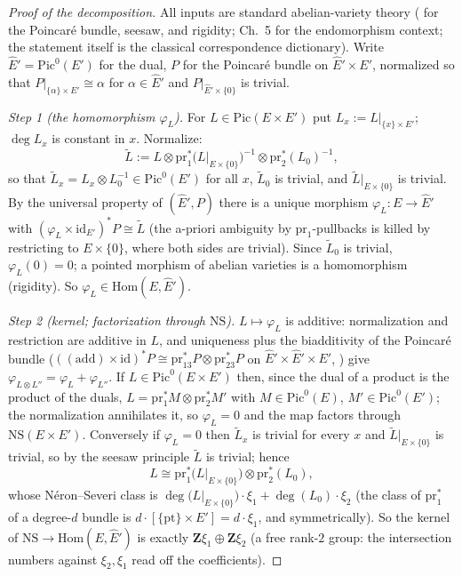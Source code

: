 \documentclass[11pt]{article}
\theoremstyle{definition}
\theoremstyle{remark}
\newcommand{\Z}{\mathbf{Z}}
\newcommand{\NS}{\mathrm{NS}}
\newcommand{\Hom}{\mathrm{Hom}}
\newcommand{\Pic}{\mathrm{Pic}}
\newcommand{\pr}{\mathrm{pr}}
\begin{document}
\begin{proof}[Proof of the decomposition]
All inputs are standard abelian-variety theory (\cite[Ch.~2]{BL} for the
Poincar\'e bundle, seesaw, and rigidity; Ch.~5 for the endomorphism context;
the statement itself is the classical correspondence dictionary). Write
$\hat{E}' = \Pic^0(E')$ for the dual, $P$ for the Poincar\'e bundle on
$\hat{E}' \times E'$, normalized so that
$P|_{\{\alpha\}\times E'} \cong \alpha$ for $\alpha \in \hat{E}'$ and
$P|_{\hat{E}'\times\{0\}}$ is trivial.

\emph{Step 1 (the homomorphism $\varphi_L$).} For $L \in \Pic(E\times E')$
put $L_x := L|_{\{x\}\times E'}$; $\deg L_x$ is constant in $x$. Normalize:
\[
\widetilde{L} := L \otimes \pr_1^*\bigl(L|_{E\times\{0\}}\bigr)^{-1}
 \otimes \pr_2^*(L_0)^{-1} ,
\]
so that $\widetilde{L}_x = L_x \otimes L_0^{-1} \in \Pic^0(E')$ for all $x$,
$\widetilde{L}_0$ is trivial, and $\widetilde{L}|_{E\times\{0\}}$ is
trivial. By the universal property of $(\hat{E}', P)$ there is a unique
morphism $\varphi_L\colon E \to \hat{E}'$ with
$(\varphi_L \times \mathrm{id}_{E'})^* P \cong \widetilde{L}$ (the a-priori
ambiguity by $\pr_1$-pullbacks is killed by restricting to $E\times\{0\}$,
where both sides are trivial). Since $\widetilde{L}_0$ is trivial,
$\varphi_L(0) = 0$; a pointed morphism of abelian varieties is a
homomorphism (rigidity). So $\varphi_L \in \Hom(E, \hat{E}')$.

\emph{Step 2 (kernel; factorization through $\NS$).} $L \mapsto \varphi_L$
is additive: normalization and restriction are additive in $L$, and
uniqueness plus the biadditivity of the Poincar\'e bundle
($((\mathrm{add})\times\mathrm{id})^* P \cong \pr_{13}^* P \otimes
\pr_{23}^* P$ on $\hat{E}'\times\hat{E}'\times E'$, \cite[Ch.~2]{BL}) give
$\varphi_{L\otimes L''} = \varphi_L + \varphi_{L''}$. If
$L \in \Pic^0(E\times E')$ then, since the dual of a product is the product
of the duals, $L = \pr_1^* M \otimes \pr_2^* M'$ with $M \in \Pic^0(E)$,
$M' \in \Pic^0(E')$; the normalization annihilates it, so $\varphi_L = 0$
and the map factors through $\NS(E\times E')$. Conversely if
$\varphi_L = 0$ then $\widetilde{L}_x$ is trivial for every $x$ and
$\widetilde{L}|_{E\times\{0\}}$ is trivial, so by the seesaw principle
$\widetilde{L}$ is trivial; hence
\[
L \cong \pr_1^*\bigl(L|_{E\times\{0\}}\bigr) \otimes \pr_2^*(L_0) ,
\]
whose N\'eron--Severi class is
$\deg\bigl(L|_{E\times\{0\}}\bigr)\cdot\xi_1 + \deg(L_0)\cdot\xi_2$ (the
class of $\pr_1^*$ of a degree-$d$ bundle is
$d\cdot[\{\mathrm{pt}\}\times E'] = d\cdot\xi_1$, and symmetrically). So the
kernel of $\NS \to \Hom(E, \hat{E}')$ is exactly $\Z\xi_1 \oplus \Z\xi_2$ (a
free rank-$2$ group: the intersection numbers against $\xi_2, \xi_1$ read
off the coefficients).


\end{proof}
\end{document}
